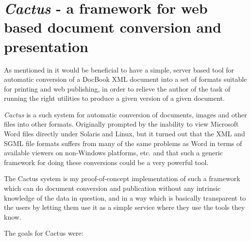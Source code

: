 %
%


\chapter{\textit{Cactus} - a framework for web based document
  conversion and presentation}

\label{cha:cactus}

As mentioned in
it would be beneficial to have a simple, server based tool for
automatic conversion of a DocBook XML document into a set of formats
suitable for printing and web publishing, in order to relieve the
author of the task of running the right utilities to produce a given
version of a given document.

\textit{Cactus} is a such system for automatic conversion of
documents, images and other files into other formats.  Originally
prompted by the inability to view Microsoft Word files directly under
Solaris and Linux, but it turned out that the XML and SGML file
formats suffers from many of the same problems as Word in terms of
available viewers on non-Windows platforms, etc.  and that such a
generic framework for doing these conversions could be a very powerful
tool.

The Cactus system is my proof-of-concept implementation of such a
framework which can do document conversion and publication without any
intrinsic knowledge of the data in question, and in a way which is
basically transparent to the users by letting them use it as a simple
service where they use the tools they know.


The goals for Cactus were:


